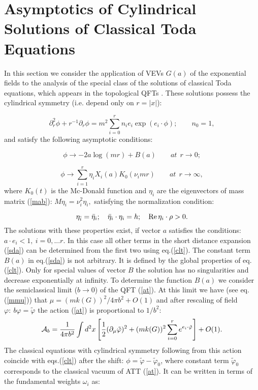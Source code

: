 \documentclass[a4paper,12pt]{article}
\begin{document}
\section{ Asymptotics of Cylindrical Solutions of Classical Toda Equations}

In this section we consider the application of VEVs $G(a)$ of the
exponential fields to the analysis of the special class of the solutions of
classical Toda equations, which appears in the topological QFTs \cite{CV}.
These solutions possess the cylindrical symmetry (i.e. depend only on 
$r=\left| x\right| $):

\begin{equation}
\partial _r^2\phi +r^{-1}\partial _r\phi =m^2\sum_{i=0}^rn_ie_i\exp
(e_i\cdot \phi );\qquad n_0=1,  \label{clt}
\end{equation}
and satisfy the following asymptotic conditions:

\begin{equation}
\phi \rightarrow -2a\log (mr)+B(a)\qquad at~\ r\rightarrow 0;  \label{sda}
\end{equation}

\begin{equation}
\phi \rightarrow \sum_{i=1}^r\eta _iX_i(a)K_0(\nu _imr)\qquad at\ \
r\rightarrow \infty ,  \label{lda}
\end{equation}
where $K_0(t)$ is the Mc-Donald function and $\eta _i$ are the eigenvectors
of mass matrix (\ref{mab}): $M\eta _i=\nu _i^2\eta _i,$ satisfying the
normalization condition:

\begin{equation}
\eta _{\bar{i}}=\bar{\eta}_i;\quad \bar{\eta}_i\cdot \eta _i=h;\quad 
\mathop{\rm Re}
\eta _i\cdot \rho >0.  \label{nrml}
\end{equation}
The solutions with these properties exist, if vector $a$ satisfies the
conditions: $a\cdot e_i<1,\ i=0,...r.$ In this case all other terms in the
short distance expansion (\ref{sda}) can be determined from the first two
using eq.(\ref{clt}). The constant term $B(a)$ in eq.(\ref{sda}) is not
arbitrary. It is defined by the global properties of eq.(\ref{clt}). Only
for special values of vector $B$ the solution has no singularities and
decrease exponentially at infinity. To determine the function $B(a)$ we
consider the semiclassical limit ($b\rightarrow 0$) of the QFT (\ref{at}).
At this limit we have (see eq.(\ref{mmu})) that $\mu =(mk(G))^2/4\pi
b^2+O(1) $ and after rescaling of field $\varphi :\ b\varphi =\tilde{\varphi}
$ the action (\ref{at}) is proportional to $1/b^2$:
\begin{equation}
{\cal A}_b=\frac{1}{4\pi b^2} \int d^2x
\left[ \frac 1{2 }(\partial _\mu\tilde{\varphi} )^2+(mk(G))^2
\sum_{i=0}^re^{e_i\cdot\tilde{ \varphi}}\right]+O(1).
\label{aTTT}
\end{equation} 
The classical equations
with cylindrical symmetry following from this action 
coincide with eqs.(\ref{clt}) after the shift:
$\phi =\tilde{\varphi}-\tilde{\varphi}_0 $, where
constant term $\tilde{\varphi}_0$ corresponds to the classical vacuum of ATT
(\ref{at}). It can be written in terms of the fundamental weights $\omega _i$
as:
\end{document}

